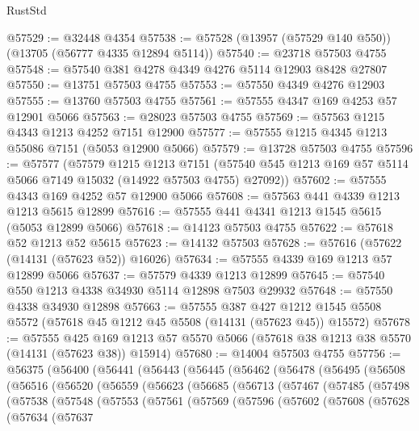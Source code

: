 \begin{lexlean}{RustStd}
\begin{coremodule}
@57529 := @32448 @4354
@57538 := @57528 (@13957 (@57529 @140 @550)) (@13705 (@56777 @4335 @12894 @5114))
@57540 := @23718 @57503 @4755
@57548 := @57540 @381 @4278 @4349 @4276 @5114 @12903 @8428 @27807
@57550 := @13751 @57503 @4755
@57553 := @57550 @4349 @4276 @12903
@57555 := @13760 @57503 @4755
@57561 := @57555 @4347 @169 @4253 @57 @12901 @5066
@57563 := @28023 @57503 @4755
@57569 := @57563 @1215 @4343 @1213 @4252 @7151 @12900
@57577 := @57555 @1215 @4345 @1213 @55086 @7151 (@5053 @12900 @5066)
@57579 := @13728 @57503 @4755
@57596 := @57577
    (@57579
      @1215
      @1213
      @7151
      (@57540 @545 @1213 @169 @57 @5114 @5066 @7149 @15032 (@14922 @57503 @4755) @27092))
@57602 := @57555 @4343 @169 @4252 @57 @12900 @5066
@57608 := @57563 @441 @4339 @1213 @1213 @5615 @12899
@57616 := @57555 @441 @4341 @1213 @1545 @5615 (@5053 @12899 @5066)
@57618 := @14123 @57503 @4755
@57622 := @57618 @52 @1213 @52 @5615
@57623 := @14132 @57503
@57628 := @57616 (@57622 (@14131 (@57623 @52)) @16026)
@57634 := @57555 @4339 @169 @1213 @57 @12899 @5066
@57637 := @57579 @4339 @1213 @12899
@57645 := @57540 @550 @1213 @4338 @34930 @5114 @12898 @7503 @29932
@57648 := @57550 @4338 @34930 @12898
@57663 := @57555
    @387
    @427
    @1212
    @1545
    @5508
    @5572
    (@57618 @45 @1212 @45 @5508 (@14131 (@57623 @45)) @15572)
@57678 := @57555
    @425
    @169
    @1213
    @57
    @5570
    @5066
    (@57618 @38 @1213 @38 @5570 (@14131 (@57623 @38)) @15914)
@57680 := @14004 @57503 @4755
@57756 := @56375
    (@56400
      (@56441
        (@56443
          (@56445
            (@56462
              (@56478
                (@56495
                  (@56508
                    (@56516
                      (@56520
                        (@56559
                          (@56623
                            (@56685
                              (@56713
                                (@57467
                                  (@57485
                                    (@57498
                                      (@57538
                                        (@57548
                                          (@57553
                                            (@57561
                                              (@57569
                                                (@57596
                                                  (@57602
                                                    (@57608
                                                      (@57628
                                                        (@57634
                                                          (@57637

\end{coremodule}
\end{lexlean}
